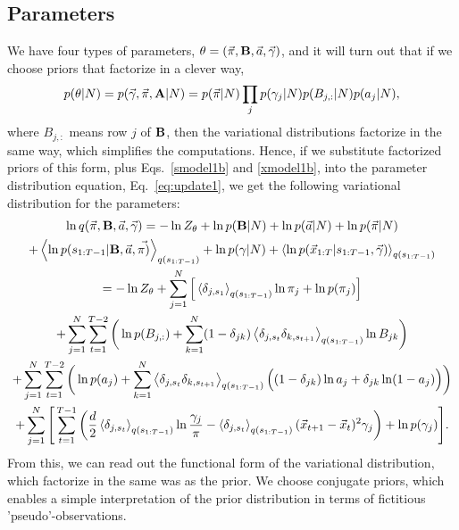\subsection{Parameters}
We have four types of parameters,
$\theta=(\vec\pi,\mathbf{B},\vec a,\vec \gamma)$, and it will turn out that
if we choose priors that factorize in a clever way,
\begin{equation}\label{pfactorization}
p(\theta|N)=p(\vec{\gamma},\vec{\pi},\mathbf{A}|N)
=p(\vec\pi|N)\prod_jp(\gamma_j|N)p(B_{j,:}|N)p(a_j|N),
\end{equation}
where $B_{j,:}$ means row $j$ of $\mathbf{B}$, then the variational
distributions factorize in the same way, which simplifies the
computations. Hence, if we substitute factorized priors of this form,
plus Eqs.~\eqref{smodel1b} and \eqref{xmodel1b}, into the parameter
distribution equation, Eq.~\eqref{eq:update1}, we get the following
variational distribution for the parameters:
\begin{multline}\label{Maverage}
  \ln q(\vec{\pi},\matris{B},\vec a,\vec{\gamma})=
  -\ln Z_\theta  
    +\ln p(\matris{B}|N)+\ln p(\vec{a}|N)+\ln p(\vec{\pi}|N)\\
    +\mean{\ln p(s_{1:T-1}|\matris{B},\vec a,\vec{\pi)}}_{q(s_{1:T-1})}
  +\ln p(\gamma|N)+\mean{\ln p(\x_{1:T}|s_{1:T-1},\vec{\gamma})}_{q(s_{1:T-1})}\\
  =-\ln Z_\theta 
  +\sum_{j=1}^N\Big[\mean{\delta_{j,s_1}}_{q(s_{1:T-1})}\ln\pi_j+\ln p(\pi_j)\Big]\\
  +\sum_{j=1}^N\sum_{t=1}^{T-2}\bigg(
  \ln p(B_{j,:})+\sum_{k=1}^N(1-\delta_{jk})
  \mean{\delta_{j,s_t}\delta_{k,s_{t+1}}}_{q(s_{1:T-1})}\ln B_{jk}
    \bigg)\\
  +\sum_{j=1}^N\sum_{t=1}^{T-2}\bigg(\ln p(a_j)
  +\sum_{k=1}^N\mean{\delta_{j,s_t}\delta_{k,s_{t+1}}}_{q(s_{1:T-1})}
  \Big((1-\delta_{jk})\ln a_j+\delta_{jk}\ln (1-a_j)\Big)
    \bigg)\\%
  +\sum_{j=1}^N\Bigg[\sum_{t=1}^{T-1}
  \bigg(
  \frac d2\mean{\delta_{j,s_t}}_{q(s_{1:T-1})}\ln\frac{\gamma_j}{\pi}
  -\mean{\delta_{j,s_t}}_{q(s_{1:T-1})}(\x_{t+1}-\x_t)^2\gamma_j
  \bigg)+\ln p(\gamma_j)\Bigg].
\end{multline}
From this, we can read out the functional form of the variational
distribution, which factorize in the same was as the prior. We choose
conjugate priors\cite{Mackay1997,Beal2003}, which enables a simple
interpretation of the prior distribution in terms of fictitious
'pseudo'-observations.

